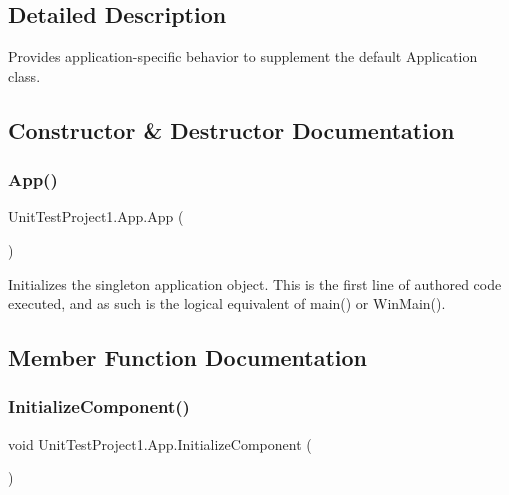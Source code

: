 \subsection{Detailed Description}
Provides application-\/specific behavior to supplement the default Application class. 



\subsection{Constructor \& Destructor Documentation}
\mbox{\label{class_unit_test_project1_1_1_app_a6856c24326e3e3cddf494d6e4b8b3a61}} 
\subsubsection{\texorpdfstring{App()}{App()}}
{\footnotesize\ttfamily Unit\+Test\+Project1.\+App.\+App (\begin{DoxyParamCaption}{ }\end{DoxyParamCaption})\hspace{0.3cm}{\ttfamily [inline]}}



Initializes the singleton application object. This is the first line of authored code executed, and as such is the logical equivalent of main() or Win\+Main(). 



\subsection{Member Function Documentation}
\mbox{\label{class_unit_test_project1_1_1_app_a1bc7aee65729fc4b0c80338cf4028b22}} 
\subsubsection{\texorpdfstring{Initialize\+Component()}{InitializeComponent()}}
{\footnotesize\ttfamily void Unit\+Test\+Project1.\+App.\+Initialize\+Component (\begin{DoxyParamCaption}{ }\end{DoxyParamCaption})\hspace{0.3cm}{\ttfamily [inline]}}



